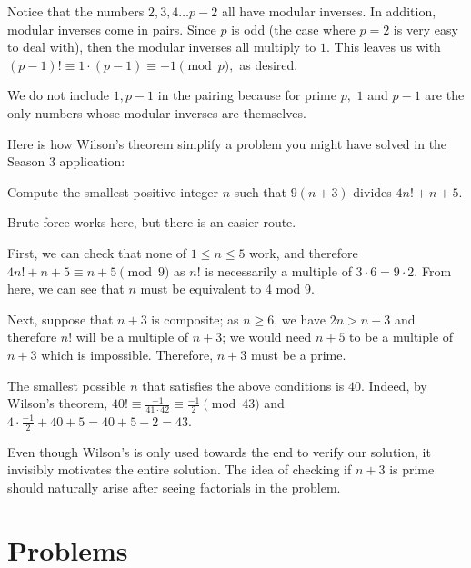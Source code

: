\documentclass[mast]{lucky}
\begin{document}
\begin{pro}[1]
Notice that the numbers $2,3,4\dots p-2$ all have modular inverses. In addition, modular inverses come in pairs. Since $p$ is odd (the case where $p=2$ is very easy to deal with), then the modular inverses all multiply to $1.$ This leaves us with $(p-1)!\equiv 1\cdot (p-1)\equiv -1\pmod{p},$ as desired.
\end{pro}

We do not include $1,p-1$ in the pairing because for prime $p,$ $1$ and $p-1$ are the only numbers whose modular inverses are themselves.

Here is how Wilson's theorem simplify a problem you might have solved in the Season 3 application:

\begin{exam}
Compute the smallest positive integer $n$ such that $9(n+3)$ divides $4n!+n+5$.
\end{exam}

\begin{sol}
Brute force works here, but there is an easier route.

First, we can check that none of $1\le n\le 5$ work, and therefore $4n!+n+5\equiv n+5\pmod{9}$ as $n!$ is necessarily a multiple of $3\cdot 6=9\cdot 2$. From here, we can see that $n$ must be equivalent to 4 mod 9.

Next, suppose that $n+3$ is composite; as $n\ge 6$, we have $2n>n+3$ and therefore $n!$ will be a multiple of $n+3$; we would need $n+5$ to be a multiple of $n+3$ which is impossible. Therefore, $n+3$ must be a prime.

The smallest possible $n$ that satisfies the above conditions is $40$. Indeed, by Wilson's theorem, $40!\equiv \frac{-1}{41\cdot 42} \equiv \frac{-1}{2}\pmod{43}$ and $4\cdot \frac{-1}{2}+40+5=40+5-2=43$.
\end{sol}

\begin{remark}
Even though Wilson's is only used towards the end to verify our solution, it invisibly motivates the entire solution. The idea of checking if $n+3$ is prime should naturally arise after seeing factorials in the problem.
\end{remark}
\pagebreak

\section{Problems}

\end{document}
